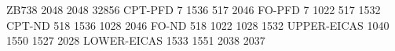 ZB738 2048 2048 32856
CPT-PFD			7  1536  517 2046
FO-PFD			7  1022  517 1532
CPT-ND			518 1536 1028 2046
FO-ND			518 1022 1028 1532
UPPER-EICAS		1040 1550 1527 2028
LOWER-EICAS		1533 1551 2038 2037